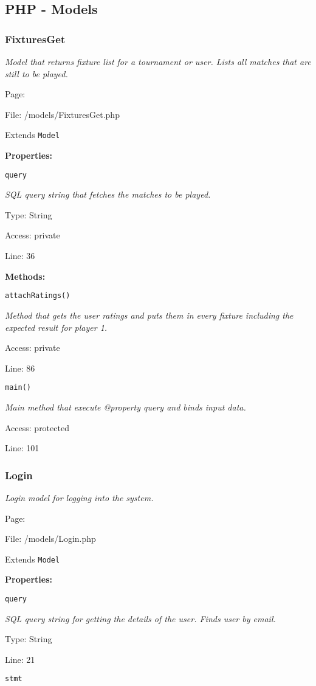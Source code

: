 \subsection{PHP - Models}
\subsubsection{FixturesGet}\label{FixturesGet.php.doc}
\textit{Model that returns fixture list for a tournament or user.
Lists all matches that are still to be played.}

Page: \pageref{FixturesGet.php}

File: /models/FixturesGet.php

Extends \texttt{Model}

\textbf{Properties:}

\texttt{query}

{\scriptsize
\textit{SQL query string that fetches the matches to be played.}

Type: String

Access: private

Line: 36

}
\textbf{Methods:}

\texttt{attachRatings()}

{\scriptsize
\textit{Method that gets the user ratings and puts them in every fixture including the expected result for player 1.}

Access: private

Line: 86

}

\texttt{main()}

{\scriptsize
\textit{Main method that execute @property query and binds input data.}

Access: protected

Line: 101

}

\subsubsection{Login}\label{Login.php.doc}
\textit{Login model for logging into the system.}

Page: \pageref{Login.php}

File: /models/Login.php

Extends \texttt{Model}

\textbf{Properties:}

\texttt{query}

{\scriptsize
\textit{SQL query string for getting the details of the user.
Finds user by email.}

Type: String

Line: 21

}
\texttt{stmt}

